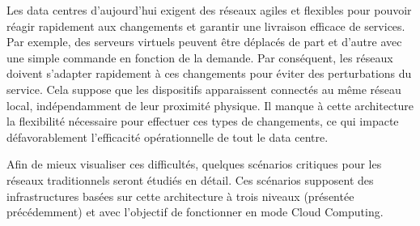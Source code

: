 Les data centres d'aujourd'hui exigent des réseaux agiles et flexibles pour pouvoir réagir rapidement aux changements et garantir une livraison efficace de services. Par exemple, des serveurs virtuels peuvent être déplacés de part et d'autre avec une simple commande en fonction de la demande. Par conséquent, les réseaux doivent s'adapter rapidement à ces changements pour éviter des perturbations du service. Cela suppose que les dispositifs apparaissent connectés au même réseau local, indépendamment de leur proximité physique. Il manque à cette architecture la flexibilité nécessaire pour effectuer ces types de changements, ce qui impacte défavorablement l'efficacité opérationnelle de tout le data centre.


Afin de mieux visualiser ces difficultés, quelques scénarios critiques pour les réseaux traditionnels seront étudiés en détail. Ces scénarios supposent des infrastructures basées sur cette architecture à trois niveaux (présentée précédemment) et avec l'objectif de fonctionner en mode Cloud Computing.  \cite{cloudReadyNetworkJuniper} \cite{hpCloudEffectsOnNetworkChanging} \cite{cloudReadyJuniperReferenceNetworkInfra} \cite{bigDataBookChap4}

